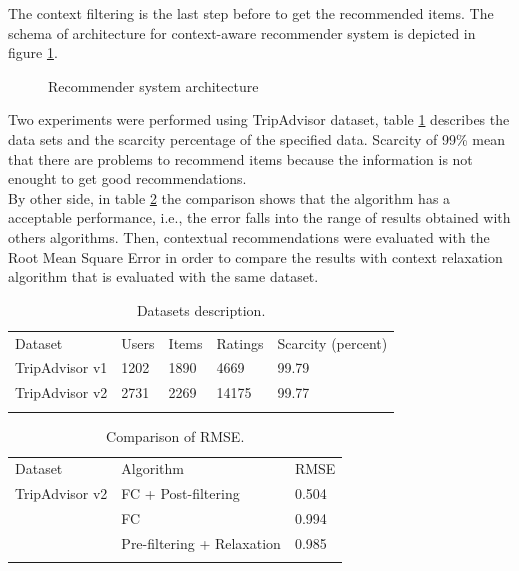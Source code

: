 The context filtering is the last step before to get the recommended
items. The schema of architecture for context-aware recommender system
is depicted in figure \ref{fig:architecture}.
\begin{figure}
	\captionsetup{justification=centering,margin=2cm}
	\centering
	\caption{Recommender system architecture}
	\label{fig:architecture}   
\end{figure}
Two experiments were performed using TripAdvisor dataset, table
\ref{tab:3} describes the data sets and the scarcity percentage of the
specified data. Scarcity of 99\% mean that there are problems to
recommend items because the information is not enought to get 
good recommendations.\\  By other side, in table \ref{tab:4} the comparison
shows that the algorithm has a acceptable performance, i.e., the error
falls into the range of results obtained with others algorithms. Then,
contextual recommendations were evaluated with the Root Mean Square
Error in order to compare the results with context relaxation
algorithm\cite{zheng2012differential} that is evaluated with the same
dataset.
\begin{table}
	\centering
	\small
	\caption{Datasets description.}
	\label{tab:3}      
	\begin{tabular}{lllll}
		\hline\noalign{\smallskip}
		Dataset & Users & Items & Ratings & Scarcity (percent) \\
		\noalign{\smallskip}\hline\noalign{\smallskip}
		TripAdvisor v1 & 1202 & 1890 & 4669 & 99.79 \\
		TripAdvisor v2 & 2731 & 2269 & 14175 & 99.77 \\
		\noalign{\smallskip}\hline
	\end{tabular}
\end{table}

\begin{table}
	\centering
	\small
	\caption{Comparison of RMSE.}
	\label{tab:4}  
	\small   
	\begin{tabular}{lll}
		\hline\noalign{\smallskip}
		Dataset & Algorithm & RMSE \\
		\noalign{\smallskip}\hline\noalign{\smallskip}
		TripAdvisor v2 & FC + Post-filtering  & 0.504  \\
		& FC          & 0.994  \\
		& Pre-filtering + Relaxation & 0.985  \\
		\noalign{\smallskip}\hline
	\end{tabular}
\end{table}

